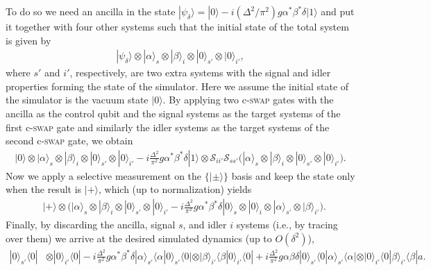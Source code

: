 \documentclass[aps,pra,twocolumn,floatfix,groupedaddress,superscriptaddress,nofootinbib,notitlepage]{revtex4-2}
\begin{document}
To do so we need an ancilla in the state $|\psi_{\delta}\rangle=|0\rangle -i(\Delta^{2}/\pi^{2}) g \alpha^{*}\beta^{*} \delta |1\rangle$ and put it together with four other systems such that the initial state of the total system is given by
\begin{align}
|\psi_{\delta}\rangle \otimes |\alpha\rangle_{s} \otimes |\beta\rangle_{i} \otimes |0\rangle_{s'} \otimes |0\rangle_{i'},
\end{align}
where $s'$ and $i'$, respectively, are two extra systems with the signal and idler properties forming the state of the simulator. Here we assume the initial state of the simulator is the vacuum state $|0\rangle$. By applying two c-\textsc{swap} gates with the ancilla as the control qubit and the signal systems as the target systems of the first c-\textsc{swap} gate and similarly the idler systems as the target systems of the second c-\textsc{swap} gate, we obtain 
\begin{align}
|0\rangle \otimes |\alpha\rangle_{s} \otimes |\beta\rangle_{i} \otimes |0\rangle_{s'} \otimes |0\rangle_{i'}
-i \frac{\Delta^{2}}{\pi^{2}}g \alpha^{*}\beta^{*} \delta |1 \rangle \otimes \mathcal{S}_{ii'} \mathcal{S}_{ss'} \big(|\alpha\rangle_{s} \otimes |\beta\rangle_{i} \otimes |0\rangle_{s'} \otimes |0\rangle_{i'} \big).
\end{align}
Now we apply a selective measurement on the $\{|\pm\rangle\}$ basis and keep the state only when the result is $|+\rangle$, which (up to normalization) yields 
\begin{align}
&|+\rangle \otimes \Big(|\alpha\rangle_{s} \otimes |\beta\rangle_{i} \otimes |0\rangle_{s'} \otimes |0\rangle_{i'} -i \frac{\Delta^{2}}{\pi^{2}}g \alpha^{*}\beta^{*} \delta |0\rangle_{s} \otimes |0\rangle_{i} \otimes |\alpha\rangle_{s'} \otimes |\beta\rangle_{i'} \Big).
\end{align}
Finally, by discarding the ancilla, signal $s$, and idler $i$ systems (i.e., by tracing over them) we arrive at the desired simulated dynamics (up to $O(\delta^{2})$),
\begin{align}
\label{NewSimState-1}
 |0 \rangle_{s'}\langle 0| &\otimes |0 \rangle_{i'}\langle 0| -i \frac{\Delta^{2}}{\pi^{2}}g \alpha^{*}\beta^{*} \delta 
|\alpha \rangle_{s'}\langle \alpha |0 \rangle_{s'}\langle 0| \otimes |\beta\rangle_{i'}\langle \beta |0 \rangle_{i'}\langle 0|
+i \frac{\Delta^{2}}{\pi^{2}}g \alpha \beta \delta |0 \rangle_{s'}\langle 0|\alpha\rangle_{s'}\langle \alpha| \otimes |0 \rangle_{i'}\langle 0|\beta\rangle_{i'}\langle \beta|a.
\end{align}
\end{document}
